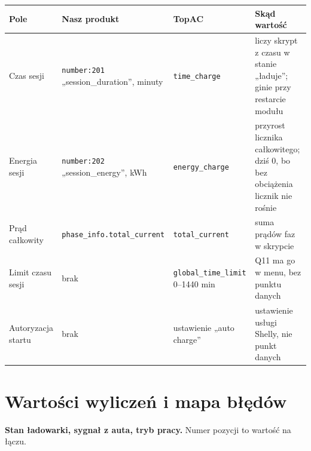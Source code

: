 \documentclass[11pt,a4paper]{article}
\begin{document}
\begin{longtable}{>{\raggedright\arraybackslash}p{3.00cm}>{\raggedright\arraybackslash}p{3.34cm}>{\raggedright\arraybackslash}p{2.41cm}>{\raggedright\arraybackslash}p{6.08cm}}
\toprule
\rowcolor{apteallight}\textbf{Pole} & \textbf{Nasz produkt} & \textbf{TopAC} & \textbf{Skąd wartość} \\
\midrule\endhead
\bottomrule\endfoot
Czas sesji & \texttt{number:201} „session\_duration”, minuty & \texttt{time\_charge} & liczy skrypt z czasu w stanie „ładuje”; ginie przy restarcie modułu \\
Energia sesji & \texttt{number:202} „session\_energy”, kWh & \texttt{energy\_\allowbreak{}charge} & przyrost licznika całkowitego; dziś 0, bo bez obciążenia licznik nie rośnie \\
Prąd całkowity & \texttt{phase\_\allowbreak{}info.\allowbreak{}total\_\allowbreak{}current} & \texttt{total\_\allowbreak{}current} & suma prądów faz w skrypcie \\
Limit czasu sesji & brak & \texttt{global\_\allowbreak{}time\_\allowbreak{}limit} 0–1440 min & Q11 ma go w menu, bez punktu danych \\
Autoryzacja startu & brak & ustawienie „auto charge” & ustawienie usługi Shelly, nie punkt danych \\
\end{longtable}

\section{Wartości wyliczeń i mapa błędów}

\textbf{Stan ładowarki, sygnał z auta, tryb pracy.} Numer pozycji to wartość na łączu.
\end{document}
